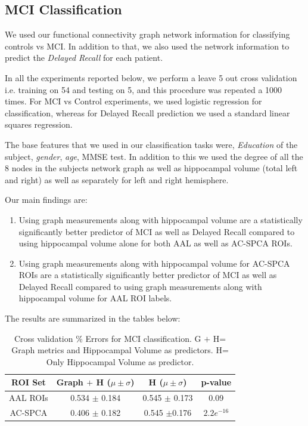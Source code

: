 \documentclass{article}
\begin{document}
\subsection{MCI Classification}
We used our functional connectivity graph network information for classifying controls vs MCI. In addition to that, we also used the network information to predict the {\it Delayed Recall} for each patient. 


In all the experiments reported below, we perform a leave 5 out cross validation i.e. training on 54 and testing on 5, and this procedure was repeated a 1000 times. For MCI vs Control experiments, we used logistic regression for classification, whereas for Delayed Recall prediction we used a standard linear squares regression. 

The base features that we used in our classification tasks were, {\it Education} of the subject, {\it gender}, {\it age}, MMSE test. In addition to this we used the degree of all the 8 nodes in the subjects network graph as well as hippocampal volume (total left and right) as well as separately for left and right hemisphere. 

Our main findings are:
\begin{enumerate}
\item Using graph measurements along with hippocampal volume are a statistically significantly better predictor of MCI as well as Delayed Recall compared to using hippocampal volume alone for both AAL as well as AC-SPCA ROIs.
\item Using graph measurements along with hippocampal volume for AC-SPCA ROIs are a statistically significantly better predictor of MCI as well as Delayed Recall compared to using graph measurements along with hippocampal volume for AAL ROI labels.
\end{enumerate}
The results are summarized in the tables below:

\begin{table}
\begin{center}
\begin{small}
\begin{tabular}{|c|c|c|c|}
\hline
 ROI Set& Graph $+$ H  ($\mu\pm\sigma$) & H  ($\mu\pm\sigma$) & p-value  \\
\hline
AAL ROIs & 0.534 $\pm$ 0.184 &0.545 $\pm$ 0.173  &0.09\\
AC-SPCA &  0.406 $\pm$ 0.182  &   0.545 $\pm $0.176 & $2.2e^{-16}$\\
   \hline
\end{tabular}
\end{small}
\vspace{0.1in}
\caption{Cross validation $\%$ Errors for MCI classification. G $+$ H= Graph metrics and Hippocampal Volume as predictors. H= Only Hippocampal Volume as predictor. }
\end{center}
\end{table}
\end{document}
